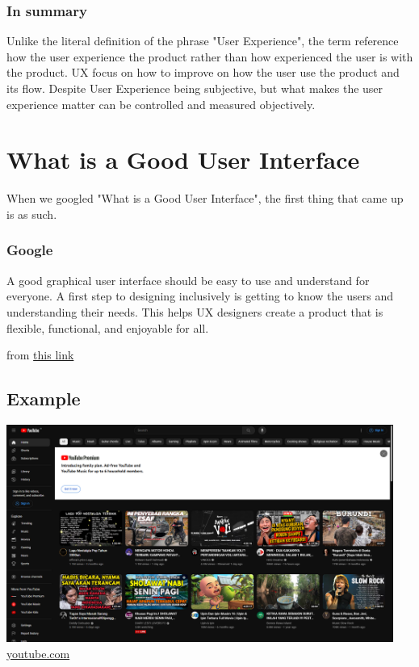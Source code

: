 \documentclass[12pt,titlepage]{article}
\begin{document}
\subsubsection*{In summary}
Unlike the literal definition of the phrase "User Experience", the term reference how the user experience the product rather than how experienced the user is with the product. UX focus on how to improve on how the user use the product and its flow. Despite User Experience being subjective, but what makes the user experience matter can be controlled and measured objectively. 

\newpage

\section{What is a Good User Interface}
When we googled "What is a Good User Interface", the first thing that came up is as such.

\subsubsection*{Google}
A good graphical user interface should be easy to use and understand for everyone. A first step to designing inclusively is getting to know the users and understanding their needs. This helps UX designers create a product that is flexible, functional, and enjoyable for all.

from \href{https://www.uxpin.com/studio/blog/good-ui-design-characteristics/#:~:text=A%20good%20graphical%20user%20interface,functional%2C%20and%20enjoyable%20for%20all.}{this link}
 
\subsection*{Example}

\includegraphics[width=0.95\textwidth]{images/figures/fig1.png}\\
\href{https://www.youtube.com}{youtube.com}
\end{document}
